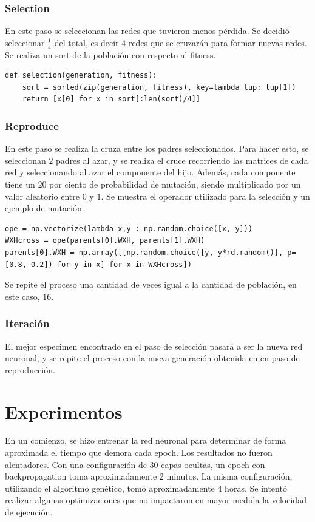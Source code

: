 \documentclass[11pt,letterpaper]{article}
\begin{document}
\subsubsection{Selection}
En este paso se seleccionan las redes que tuvieron menos pérdida. Se decidió seleccionar $\frac{1}{4}$ 
del total, es decir $4$ redes que se cruzarán para formar nuevas redes. Se realiza un sort de la población 
con respecto al fitness.

\begin{lstlisting}
def selection(generation, fitness):
    sort = sorted(zip(generation, fitness), key=lambda tup: tup[1])
    return [x[0] for x in sort[:len(sort)/4]]
\end{lstlisting}

\subsubsection{Reproduce}
En este paso se realiza la cruza entre los padres seleccionados. Para hacer esto, se seleccionan 
$2$ padres al azar, y se realiza el cruce recorriendo las matrices de cada red y seleccionando al azar 
el componente del hijo. Además, cada componente tiene un $20$ por ciento de probabilidad de mutación, 
siendo multiplicado por un valor aleatorio entre $0$ y $1$. Se muestra el operador utilizado para la 
selección y un ejemplo de mutación.

\begin{lstlisting}
ope = np.vectorize(lambda x,y : np.random.choice([x, y]))
WXHcross = ope(parents[0].WXH, parents[1].WXH)
parents[0].WXH = np.array([[np.random.choice([y, y*rd.random()], p=[0.8, 0.2]) for y in x] for x in WXHcross])
\end{lstlisting}

Se repite el proceso una cantidad de veces igual a la cantidad de población, en este caso, $16$.

\subsubsection{Iteración}
El mejor especimen encontrado en el paso de selección pasará a ser la nueva red neuronal, 
y se repite el proceso con la nueva generación obtenida en en paso de reproducción.

\section{Experimentos}
En un comienzo, se hizo entrenar la red neuronal para determinar de forma aproximada el tiempo que 
demora cada epoch. Los resultados no fueron alentadores. Con una configuración de 30 capas ocultas, un epoch 
con backpropagation toma aproximadamente 2 minutos. La misma configuración, utilizando el algoritmo genético, 
tomó aproximadamente 4 horas. Se intentó realizar algunas optimizaciones que no impactaron en mayor medida 
la velocidad de ejecución.\\
\end{document}
